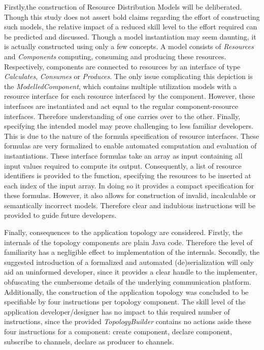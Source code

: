Firstly,the construction of Resource Distribution Models will be deliberated. Though this study does not assert bold claims regarding the effort of constructing such models, the relative impact of a reduced skill level to the effort required can be predicted and discussed. Though a model instantiation may seem daunting, it is actually constructed using only a few concepts. A model consists of \emph{Resources} and \emph{Components} computing, consuming and producing these resources. Respectively, components are connected to resources by an interface of type \emph{Calculates}, \emph{Consumes} or \emph{Produces}. The only issue complicating this depiction is the \emph{ModelledComponent}, which contains multiple utilization models with a resource interface for each resource interfaced by the component. However, these interfaces are instantiated and act equal to the regular component-resource interfaces. Therefore understanding of one carries over to the other. Finally, specifying the intended model may prove challenging to less familiar developers. This is due to the nature of the formula specification of resource interfaces. These formulas are very formalized to enable automated computation and evaluation of instantiations. These interface formulas take an array as input containing all input values required to compute its output. Consequently, a list of resource identifiers is provided to the function, specifying the resources to be inserted at each index of the input array. In doing so it provides a compact specification for these formulas. However, it also allows for construction of invalid, incalculable or semantically incorrect models. Therefore clear and indubious instructions will be provided to guide future developers.

Finally, consequences to the application topology are considered. Firstly, the internals of the topology components are plain Java code. Therefore the level of familiarity has a negligible effect to implementation of the internals. Secondly, the suggested introduction of a formalized and automated (de)serialization will only aid an uninformed developer, since it provides a clear handle to the implementer, obfuscating the cumbersome details of the underlying communication platform. Additionally, the construction of the application topology was concluded to be specifiable by four instructions per topology component. The skill level of the application developer/designer has no impact to this required number of instructions, since the provided \emph{TopologyBuilder} contains no actions aside these four instructions for a component: create component, declare component, subscribe to channels, declare as producer to channels. 

